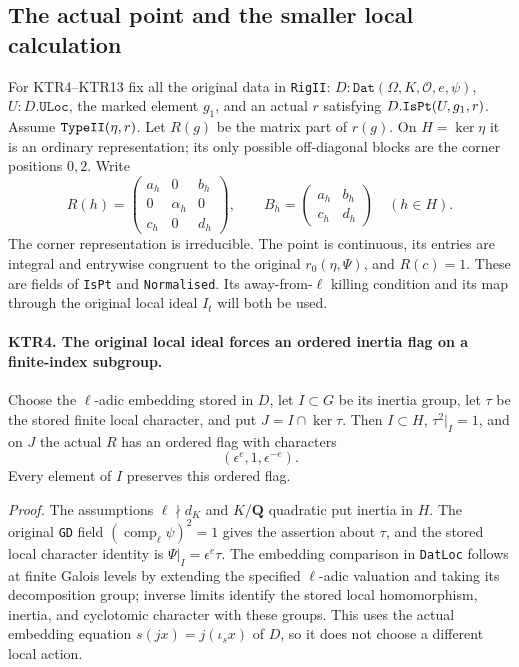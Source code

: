 \documentclass[11pt,a4paper]{article}
\numberwithin{equation}{section}
\theoremstyle{remark}\newtheorem{remark}[theorem]{Remark}
\begin{document}
\subsection{The actual point and the smaller local calculation}

For KTR4--KTR13 fix all the original data in \texttt{Rig\allowbreak II}:
\(D:\texttt{Dat}(\Omega,K,\mathcal O,e,\psi)\),
\(U:D.\texttt{ULoc}\), the marked element \(g_1\), and
an actual \(r\) satisfying \(D.\texttt{Is\allowbreak Pt}(U,g_1,r)\).
Assume \(\texttt{Type\allowbreak II}(\eta,r)\).  Let \(R(g)\) be the
matrix part of \(r(g)\).  On \(H=\ker\eta\) it is an
ordinary representation; its only possible off-diagonal blocks
are the corner positions \(0,2\).  Write
\[
 R(h)=\begin{pmatrix}a_h&0&b_h\\0&\alpha_h&0\\c_h&0&d_h\end{pmatrix},
 \qquad B_h=\begin{pmatrix}a_h&b_h\\c_h&d_h\end{pmatrix}
 \quad(h\in H).
 \tag{KTR.5}
\]
The corner representation is irreducible.  The point is continuous,
its entries are integral and entrywise congruent to the original
\(r_0(\eta,\Psi)\), and \(R(c)=1\).
These are fields of \texttt{Is\allowbreak Pt} and \texttt{Normalised}.
Its away-from-\(\ell\) killing condition and its map through
the original local ideal \(I_t\) will both be used.

\paragraph{KTR4. The original local ideal forces an ordered inertia flag on a finite-index subgroup.}
\label{claim:KTR4}
Choose the \(\ell\)-adic embedding stored in \(D\), let
\(I\subset G\) be its inertia group, let \(\tau\) be the
stored finite local character, and put \(J=I\cap\ker\tau\).
Then \(I\subset H\), \(\tau^2|_I=1\), and on \(J\)
the actual \(R\) has an ordered flag with characters
\[
                      (\epsilon^e,1,\epsilon^{-e}).
 \tag{KTR.6}
\]
Every element of \(I\) preserves this ordered flag.

\emph{Proof.}
The assumptions \(\ell\nmid d_K\) and \(K/\mathbf Q\)
quadratic put inertia in \(H\).  The original \texttt{GD}
field \((\operatorname{comp}_\ell\psi)^2=1\) gives the
assertion about \(\tau\), and the stored local character
identity is \(\Psi|_I=\epsilon^e\tau\).
The embedding comparison in \texttt{Dat\allowbreak Loc} follows at finite
Galois levels by extending the specified \(\ell\)-adic
valuation and taking its decomposition group; inverse limits
identify the stored local homomorphism, inertia, and cyclotomic
character with these groups.  This uses the actual embedding
equation \(s(jx)=j(\iota_s x)\) of \(D\), so it does not
choose a different local action.
\end{document}
